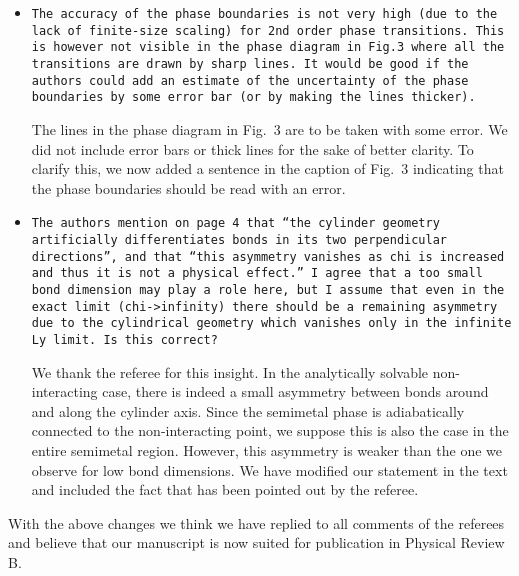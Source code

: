 \documentclass[aps,prb,superscriptaddress]{revtex4}
\begin{document}
\begin{itemize}
\item{\tt The accuracy of the phase boundaries is not very high (due to the
lack of finite-size scaling) for 2nd order phase transitions. This is
however not visible in the phase diagram in Fig.3 where all the
transitions are drawn by sharp lines. It would be good if the authors
could add an estimate of the uncertainty of the phase boundaries by
some error bar (or by making the lines thicker).}

The lines in the phase diagram in Fig.~3 are to be taken with some error. We did not include error bars or thick lines for the sake of better clarity. To clarify this, we now added a sentence in the caption of Fig.~3 indicating that the phase boundaries should be read with an error.

\item{\tt The authors mention on page 4 that “the cylinder geometry
artificially differentiates bonds in its two perpendicular
directions”, and that “this asymmetry vanishes as chi is increased and
thus it is not a physical effect.” I agree that a too small bond
dimension may play a role here, but I assume that even in the exact
limit (chi->infinity) there should be a remaining asymmetry due to the
cylindrical geometry which vanishes only in the infinite Ly limit. Is
this correct?}

We thank the referee for this insight. In the analytically solvable non-interacting case, there is indeed a small asymmetry between bonds around and along the cylinder axis. Since the semimetal phase is adiabatically connected to the non-interacting point, we suppose this is also the case in the entire semimetal region. However, this asymmetry is weaker than the one we observe for low bond dimensions. We have modified our statement in the text and included the fact that has been pointed out by the referee.

\end{itemize}


With the above changes we think we have replied to all comments of the referees and believe that our manuscript is now suited for publication in Physical Review B. 
\end{document}
